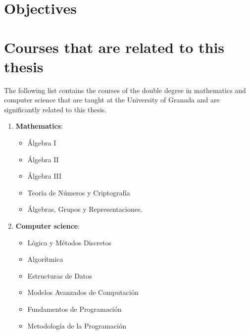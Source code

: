 \section{Objectives}

\section{Courses that are related to this thesis}

The following list contains the courses of the double degree in mathematics and computer science that are taught at the University of Granada and are significantly related to this thesis.
\begin{enumerate}
  
\item \textbf{Mathematics}:
  
\begin{itemize}
\item Álgebra I
\item Álgebra II
\item Álgebra III
\item Teoría de Números y Criptografía
\item Álgebras, Grupos y Representaciones.
\end{itemize}

\item \textbf{Computer science}:  
\begin{itemize}
\item Lógica y Métodos Discretos
\item Algorítmica
\item Estructuras de Datos
\item Modelos Avanzados de Computación
\item Fundamentos de Programación
\item Metodología de la Programación
\end{itemize}
\end{enumerate}
